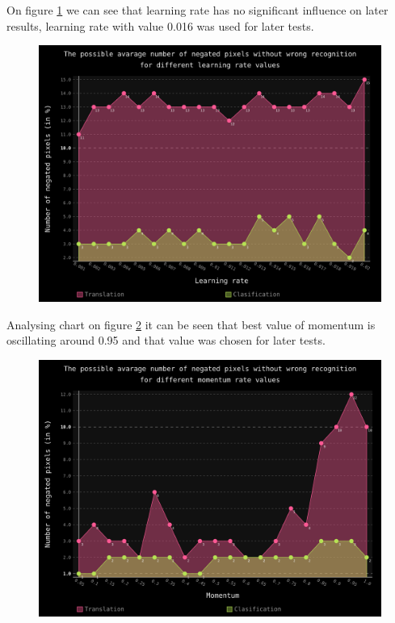 \documentclass[a4paper]{article}
\begin{document}
On figure \ref{learn} we can see that learning rate has no significant influence on later results, learning rate with value 0.016 was used for later tests.
\begin{figure}[ht]
	\centering
	\includegraphics[scale=0.7,keepaspectratio=true]{Charts/learnChart.png}	
	\caption{}
	\label{learn}
\end{figure} 

Analysing chart on figure \ref{momentum} it can be seen that best value of momentum is oscillating around 0.95 and that value was chosen for later tests.
\begin{figure}[ht]
	\centering
	\includegraphics[scale=0.7,keepaspectratio=true]{Charts/momentumChart.png}	
	\caption{}
	\label{momentum}
\end{figure}
\end{document}
